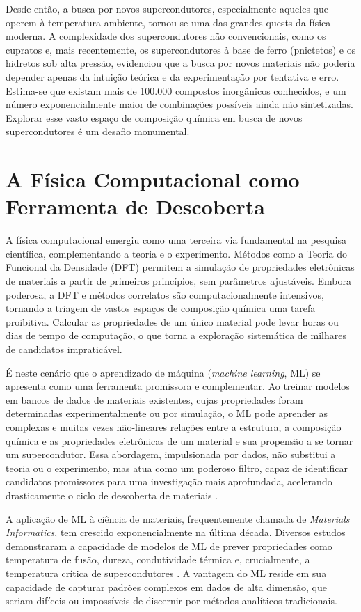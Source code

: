\documentclass[12pt, a4paper, oneside]{report}
\begin{document}
Desde então, a busca por novos supercondutores, especialmente aqueles que operem à temperatura ambiente, tornou-se uma das grandes quests da física moderna. A complexidade dos supercondutores não convencionais, como os cupratos e, mais recentemente, os supercondutores à base de ferro (pnictetos) \cite{kamihara2008} e os hidretos sob alta pressão, evidenciou que a busca por novos materiais não poderia depender apenas da intuição teórica e da experimentação por tentativa e erro. Estima-se que existam mais de 100.000 compostos inorgânicos conhecidos, e um número exponencialmente maior de combinações possíveis ainda não sintetizadas. Explorar esse vasto espaço de composição química em busca de novos supercondutores é um desafio monumental.

\section{A Física Computacional como Ferramenta de Descoberta}

A física computacional emergiu como uma terceira via fundamental na pesquisa científica, complementando a teoria e o experimento. Métodos como a Teoria do Funcional da Densidade (DFT) permitem a simulação de propriedades eletrônicas de materiais a partir de primeiros princípios, sem parâmetros ajustáveis. Embora poderosa, a DFT e métodos correlatos são computacionalmente intensivos, tornando a triagem de vastos espaços de composição química uma tarefa proibitiva. Calcular as propriedades de um único material pode levar horas ou dias de tempo de computação, o que torna a exploração sistemática de milhares de candidatos impraticável.

É neste cenário que o aprendizado de máquina (\textit{machine learning}, ML) se apresenta como uma ferramenta promissora e complementar. Ao treinar modelos em bancos de dados de materiais existentes, cujas propriedades foram determinadas experimentalmente ou por simulação, o ML pode aprender as complexas e muitas vezes não-lineares relações entre a estrutura, a composição química e as propriedades eletrônicas de um material e sua propensão a se tornar um supercondutor. Essa abordagem, impulsionada por dados, não substitui a teoria ou o experimento, mas atua como um poderoso filtro, capaz de identificar candidatos promissores para uma investigação mais aprofundada, acelerando drasticamente o ciclo de descoberta de materiais \cite{stanev2018, himanen2020}.

A aplicação de ML à ciência de materiais, frequentemente chamada de \textit{Materials Informatics}, tem crescido exponencialmente na última década. Diversos estudos demonstraram a capacidade de modelos de ML de prever propriedades como temperatura de fusão, dureza, condutividade térmica e, crucialmente, a temperatura crítica de supercondutores \cite{hamidieh2018}. A vantagem do ML reside em sua capacidade de capturar padrões complexos em dados de alta dimensão, que seriam difíceis ou impossíveis de discernir por métodos analíticos tradicionais.
\end{document}
